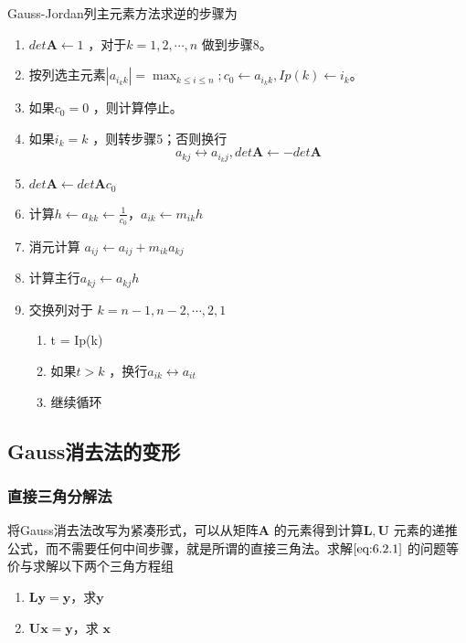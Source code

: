 \documentclass[a4paper]{article}
\begin{document}
Gauss-Jordan列主元素方法求逆的步骤为
\begin{enumerate}
	\item $det \mathbf{A} \gets 1$ ，对于$k=1,2,\cdots, n$ 做到步骤8。
	\item 按列选主元素$|a_{i_k k}| = \max_{k \le i \le n}; c_0 \gets a_{i_k k}, Ip(k) \gets i_k$。
	\item 如果$c_0 = 0$ ，则计算停止。
	\item 如果$i_k = k$ ，则转步骤5；否则换行
		\[
			a_{kj} \leftrightarrow a_{i_k j}, det \mathbf{A} \gets -det \mathbf{A}
		\] 
	\item $det \mathbf{A} \gets det \mathbf{A} c_0$
	\item 计算$h \gets a_{kk} \gets \frac{1}{c_0}$，$a_{ik} \gets m_{ik} h$
	\item 消元计算 $a_{ij} \gets a_{ij} + m_{ik} a_{kj}$
	\item 计算主行$a_{kj} \gets a_{kj} h$
	\item 交换列对于 $k = n-1, n-2, \cdots, 2,1$ 
		\begin{enumerate}
			\item t = Ip(k)
			\item 如果$t > k$ ，换行$a_{ik} \leftrightarrow a_{it}$
			\item 继续循环
		\end{enumerate}
\end{enumerate}

\subsection{Gauss消去法的变形}
\subsubsection{直接三角分解法}
将Gauss消去法改写为紧凑形式，可以从矩阵$\mathbf{A}$ 的元素得到计算$\mathbf{L}, \mathbf{U}$ 元素的递推公式，而不需要任何中间步骤，就是所谓的直接三角法。求解$\ref{eq:6.2.1}$ 的问题等价与求解以下两个三角方程组
\begin{enumerate}
	\item $\mathbf{Ly} = \mathbf{y}$，求$\mathbf{y}$
	\item  $\mathbf{Ux} = \mathbf{y}$，求 $\mathbf{x}$
\end{enumerate}
\end{document}
